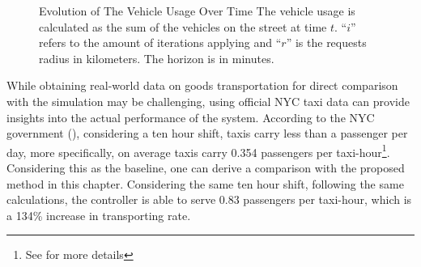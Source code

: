 \begin{figure}[t]
	\caption[Evolution of The Vehicle Usage Over Time]{Evolution of The Vehicle Usage Over Time The vehicle usage is calculated as the sum of the vehicles on the street at time $t$. ``$i$'' refers to the amount of iterations applying  and ``$r$'' is the requests radius in kilometers. The horizon is in minutes. }
	\label{fig:vehicle_usage_km_r}
\end{figure}

While obtaining real-world data on goods transportation for direct comparison with the simulation may be challenging, using official NYC taxi data can provide insights into the actual performance of the system. According to the NYC government (\cite{nyc_taxi_history}), considering a ten hour shift, taxis carry less than a passenger per day, more specifically, on average taxis carry 0.354 passengers per taxi-hour\footnote{See  for more details}. Considering this as the baseline, one can derive a comparison with the proposed method in this chapter. Considering the same ten hour shift, following the same calculations, the controller is able to serve 0.83 passengers per taxi-hour, which is a 134\% increase in transporting rate. 

















